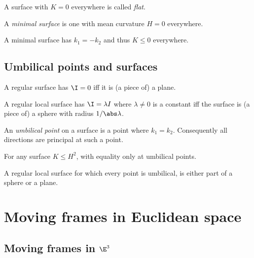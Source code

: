 \documentclass{article}
\begin{document}
\begin{definition}
	A surface with $K=0$ everywhere is called \emph{flat}.
\end{definition}

\begin{definition}
	A \emph{minimal surface} is one with mean curvature $H=0$ everywhere.
\end{definition}

\begin{lemma}
	A minimal surface has $k_1=-k_2$ and thus $K \leq 0$ everywhere.
\end{lemma}

\subsection{Umbilical points and surfaces}

\begin{theorem}[Notes 9.19]
	A regular surface has $\I=0$ iff it is (a piece of) a plane.
\end{theorem}

\begin{theorem}[Notes 9.20]
	A regular local surface has $\I = \lambda I$ where $\lambda \not=0$ is a constant iff
	the surface is (a piece of) a sphere with radius $1/\abs\lambda$.
\end{theorem}

\begin{definition}
	An \emph{umbilical point} on a surface is a point where $k_1=k_2$. Consequently all
	directions are principal at such a point.
\end{definition}

\begin{lemma}[Notes 9.22]
	For any surface $K\leq H^2$, with equality only at umbilical points.
\end{lemma}

\begin{theorem}[Notes 9.23]
	A regular local surface for which every point is umbilical, is either part of a sphere
	or a plane.
\end{theorem}

\section{Moving frames in Euclidean space}

\subsection{Moving frames in $\E^3$}
\end{document}
